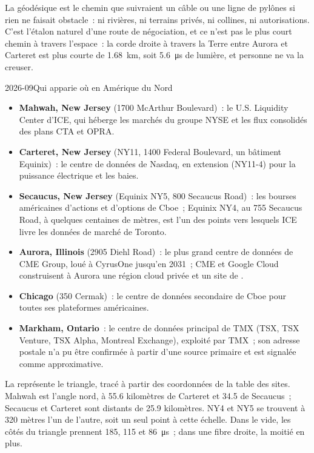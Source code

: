 La géodésique est le chemin que suivraient un câble ou une ligne de pylônes si rien ne faisait obstacle~: ni rivières, ni terrains privés, ni collines, ni
autorisations. C'est l'étalon naturel d'une route de négociation, et ce n'est pas le plus court chemin à travers l'espace~: la corde droite à travers la
Terre entre Aurora et Carteret est plus courte de \qty{1.68}{\kilo\metre}, soit \qty{5.6}{\micro\second} de lumière, et personne ne va la creuser.

\begin{dated}{2026-09}{Qui apparie où en Amérique du Nord}\label{dat:nw:the-north-american-map:sites}
\begin{itemize}
\item \textbf{Mahwah, New Jersey} (1700 McArthur Boulevard)~: le U.S. Liquidity Center d'ICE, qui héberge les marchés du groupe NYSE et les
  flux consolidés des plans CTA et OPRA.
\item \textbf{Carteret, New Jersey} (NY11, 1400 Federal Boulevard, un bâtiment Equinix)~: le centre de données de Nasdaq, en extension (NY11-4) pour la
  puissance électrique et les baies.
\item \textbf{Secaucus, New Jersey} (Equinix NY5, 800 Secaucus Road)~: les bourses américaines d'actions et d'options de Cboe~; Equinix NY4, au 755
  Secaucus Road, à quelques centaines de mètres, est l'un des points vers lesquels ICE livre les données de marché de Toronto.
\item \textbf{Aurora, Illinois} (2905 Diehl Road)~: le plus grand centre de données de CME Group, loué à CyrusOne jusqu'en 2031~; CME et Google Cloud
  construisent à Aurora une région cloud privée et un site de .
\item \textbf{Chicago} (350 Cermak)~: le centre de données secondaire de Cboe pour toutes ses plateformes américaines.
\item \textbf{Markham, Ontario}~: le centre de données principal de TMX (TSX, TSX Venture, TSX Alpha, Montreal Exchange), exploité par TMX~; son adresse postale
  n'a pu être confirmée à partir d'une source primaire et est signalée comme approximative.
\end{itemize}
\end{dated}

La  représente le triangle, tracé à partir des coordonnées de la table des sites. Mahwah est l'angle nord, à 55.6
kilomètres de Carteret et 34.5 de Secaucus~; Secaucus et Carteret sont distants de 25.9 kilomètres. NY4 et NY5 se trouvent à 320 mètres l'un de
l'autre, soit un seul point à cette échelle. Dans le vide, les côtés du triangle prennent 185, 115 et \qty{86}{\micro\second}~; dans une fibre droite, la moitié en plus.

